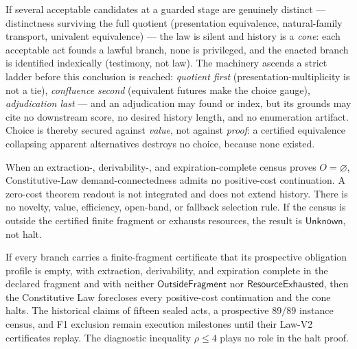\begin{definition}
\label{def:tie-ladder}
If several acceptable candidates at a guarded stage are genuinely distinct
--- distinctness surviving the full quotient (presentation equivalence,
natural-family transport, univalent equivalence) --- the law is silent and
history is a \emph{cone}: each acceptable act founds a lawful branch, none is
privileged, and the enacted branch is identified indexically (testimony, not
law). The machinery ascends a strict ladder before this conclusion is
reached: \emph{quotient first} (presentation-multiplicity is not a tie),
\emph{confluence second} (equivalent futures make the choice gauge),
\emph{adjudication last} --- and an adjudication may found or index, but its
grounds may cite no downstream score, no desired history length, and no
enumeration artifact. Choice is thereby secured against \emph{value}, not
against \emph{proof}: a certified equivalence collapsing apparent
alternatives destroys no choice, because none existed.
\end{definition}

\begin{definition}
\label{def:open-register}
When an extraction-, derivability-, and expiration-complete census proves
\(O=\varnothing\), Constitutive-Law demand-connectedness admits no
positive-cost continuation. A zero-cost theorem readout is not integrated and
does not extend history. There is no novelty, value, efficiency, open-band, or
fallback selection rule. If the census is outside the certified finite
fragment or exhausts resources, the result is \(\mathsf{Unknown}\), not halt.
\end{definition}

\begin{theorem}
\label{thm:halt}
If every branch carries a finite-fragment certificate that its prospective
obligation profile is empty, with extraction, derivability, and expiration
complete in the declared fragment and with neither
\(\mathsf{OutsideFragment}\) nor \(\mathsf{ResourceExhausted}\), then the
Constitutive Law forecloses every positive-cost continuation and the cone
halts. The historical claims of fifteen sealed acts, a prospective
\(89/89\) instance census, and F1 exclusion remain execution milestones until
their Law-V2 certificates replay. The diagnostic inequality \(\rho\le4\)
plays no role in the halt proof.
\end{theorem}

